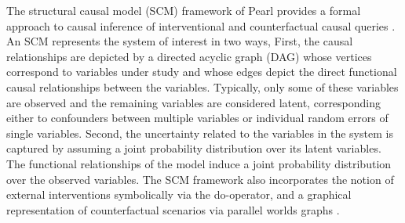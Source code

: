 
The structural causal model (SCM) framework of Pearl provides a formal approach to causal inference of interventional and counterfactual causal queries \citep{pearl2009}. An SCM represents the system of interest in two ways, First, the causal relationships are depicted by a directed acyclic graph (DAG) whose vertices correspond to variables under study and whose edges depict the direct functional causal relationships between the variables. Typically, only some of these variables are observed and the remaining variables are considered latent, corresponding either to confounders between multiple variables or individual random errors of single variables. Second, the uncertainty related to the variables in the system is captured by assuming a joint probability distribution over its latent variables. The functional relationships of the model induce a joint probability distribution over the observed variables. The SCM framework also incorporates the notion of external interventions symbolically via the do-operator, and a graphical representation of counterfactual scenarios via parallel worlds graphs \citep{avin2005pathspecific, shpitser2007, shpitser2008}.

